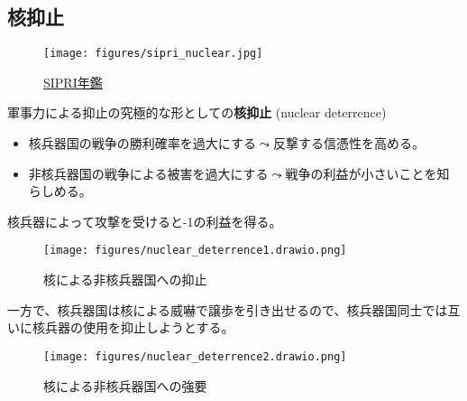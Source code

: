 \documentclass[
  xelatex,
  ja=standard]{bxjsarticle}
\providecommand{\tightlist}{%
  \setlength{\itemsep}{0pt}\setlength{\parskip}{0pt}}\usepackage{longtable,booktabs,array}
\begin{document}
\hypertarget{ux6838ux6291ux6b62}{%
\subsection{核抑止}\label{ux6838ux6291ux6b62}}

\begin{figure}[htpb]

{\centering \texttt{[image: figures/sipri\_nuclear.jpg]}

}

\caption{\href{https://www.sipri.org/yearbook/2022/10}{SIPRI年鑑}}

\end{figure}

軍事力による抑止の究極的な形としての\textbf{核抑止} (nuclear deterrence)

\begin{itemize}
\tightlist
\item
  核兵器国の戦争の勝利確率を過大にする\(\leadsto\)反撃する信憑性を高める。
\item
  非核兵器国の戦争による被害を過大にする\(\leadsto\)戦争の利益が小さいことを知らしめる。
\end{itemize}

\begin{tcolorbox}[enhanced jigsaw, coltitle=black, colbacktitle=quarto-callout-tip-color!10!white, colframe=quarto-callout-tip-color-frame, bottomrule=.15mm, toprule=.15mm, breakable, leftrule=.75mm, toptitle=1mm, left=2mm, arc=.35mm, bottomtitle=1mm, opacitybacktitle=0.6, titlerule=0mm, title=\textcolor{quarto-callout-tip-color}{\faLightbulb}\hspace{0.5em}{核による非核兵器国への抑止}, colback=white, opacityback=0, rightrule=.15mm]

核兵器によって攻撃を受けると-1の利益を得る。

\end{tcolorbox}

\begin{figure}[htpb]

{\centering \texttt{[image: figures/nuclear\_deterrence1.drawio.png]}

}

\caption{核による非核兵器国への抑止}

\end{figure}

一方で、核兵器国は核による威嚇で譲歩を引き出せるので、核兵器国同士では互いに核兵器の使用を抑止しようとする。

\begin{figure}[htpb]

{\centering \texttt{[image: figures/nuclear\_deterrence2.drawio.png]}

}

\caption{核による非核兵器国への強要}

\end{figure}
\end{document}
